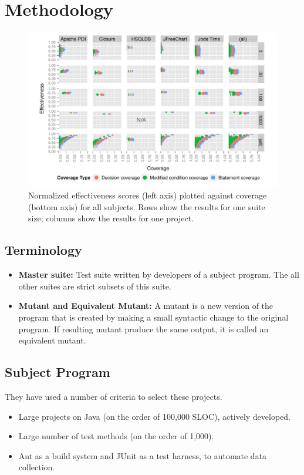 \section{Methodology}
\begin{figure}
\vspace{10pt}
\includegraphics[width=\textwidth,height=7cm]{Figures/Coverage_result.JPG}
\caption{Normalized effectiveness scores (left axis) plotted against coverage (bottom axis) for all subjects. Rows show the results for one suite size; columns show the results for one project.}
\label{f1}
\end{figure}

\subsection{Terminology}
\begin{itemize}
    \item \textbf{Master suite:} Test suite written by developers of a subject program. The all other suites are strict subsets of this suite.
    \item \textbf{Mutant and Equivalent Mutant: }A mutant is a new version of the program that is created by making a small syntactic change to the original program. If resulting mutant produce the same output, it is called an equivalent mutant.
\end{itemize}

\subsection{Subject Program}
They have used a number of criteria to select these projects. 
\begin{itemize}
    \item Large projects on Java (on the order of 100,000 SLOC), actively developed.%
    \item Large number of test methods (on the order of 1,000). %
    \item Ant as a build system and JUnit as a test harness, to automate data collection.
\end{itemize}


